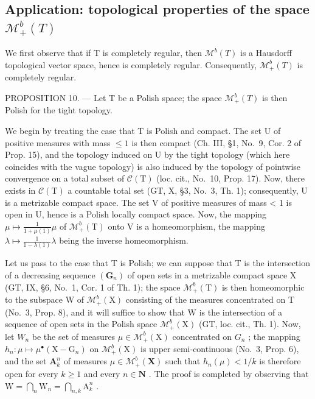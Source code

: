 \subsection{\texorpdfstring{Application: topological properties of the space \(\mathcal{M}_{+}^{b}(T)\)}{Application: topological properties of the space \textbackslash mathcal\{M\}\_\{+\}\^{}\{b\}(T)}}

We first observe that if T is completely regular, then \(\mathcal{M}^{b}(T)\) is a Hausdorff topological vector space, hence is completely regular. Consequently, \(\mathcal{M}_{+}^{b}(T)\) is completely regular.

PROPOSITION 10. --- Let T be a Polish space; the space \(\mathcal{M}_{+}^{b}(T)\) is then Polish for the tight topology.

We begin by treating the case that T is Polish and compact. The set U of positive measures with mass \(\leqslant 1\) is then compact (Ch. III, §1, No.~9, Cor. 2 of Prop. 15), and the topology induced on U by the tight topology (which here coincides with the vague topology) is also induced by the topology of pointwise convergence on a total subset of \(\mathcal{C}(\mathrm{T})\) (loc. cit., No.~10, Prop. 17). Now, there exists in \(\mathcal{C}(\mathrm{T})\) a countable total set (GT, X, §3, No.~3, Th. 1); consequently, U is a metrizable compact space. The set V of positive measures of mass \textless{} 1 is open in U, hence is a Polish locally compact space. Now, the mapping \(\mu \mapsto \frac{1}{1 + \mu(1)}\mu\) of \(\mathcal{M}_{+}^{b}(\mathrm{T})\) onto V is a homeomorphism, the mapping \(\lambda \mapsto \frac{1}{1 - \lambda(1)}\lambda\) being the inverse homeomorphism.

Let us pass to the case that T is Polish; we can suppose that T is the intersection of a decreasing sequence \((\mathbf{G}_{n})\) of open sets in a metrizable compact space X (GT, IX, §6, No.~1, Cor. 1 of Th. 1); the space \(\mathcal{M}_{+}^{b}(\mathrm{T})\) is then homeomorphic to the subspace W of \(\mathcal{M}_{+}^{b}(\mathrm{X})\) consisting of the measures concentrated on T (No.~3, Prop. 8), and it will suffice to show that W is the intersection of a sequence of open sets in the Polish space \(\mathcal{M}_{+}^{b}(\mathrm{X})\) (GT, loc. cit., Th. 1). Now, let \(W_{n}\) be the set of measures \(\mu\in\mathcal{M}_{+}^{b}(\mathrm{X})\) concentrated on \(G_{n}\) ; the mapping \(h_{n}:\mu\mapsto\mu^{\bullet}(\mathrm{X}-\mathrm{G}_{n})\) on \(\mathcal{M}_{+}^{b}(\mathrm{X})\) is upper semi-continuous (No.~3, Prop. 6), and the set \(\mathbf{A}_k^n\) of measures \(\mu \in \mathcal{M}_+^b(\mathbf{X})\) such that \(h_n(\mu) < 1 / k\) is therefore open for every \(k \geqslant 1\) and every \(n \in \mathbf{N}\) . The proof is completed by observing that \(\mathrm{W} = \bigcap_{n} \mathrm{W}_n = \bigcap_{n,k} \mathrm{A}_k^n\) .

